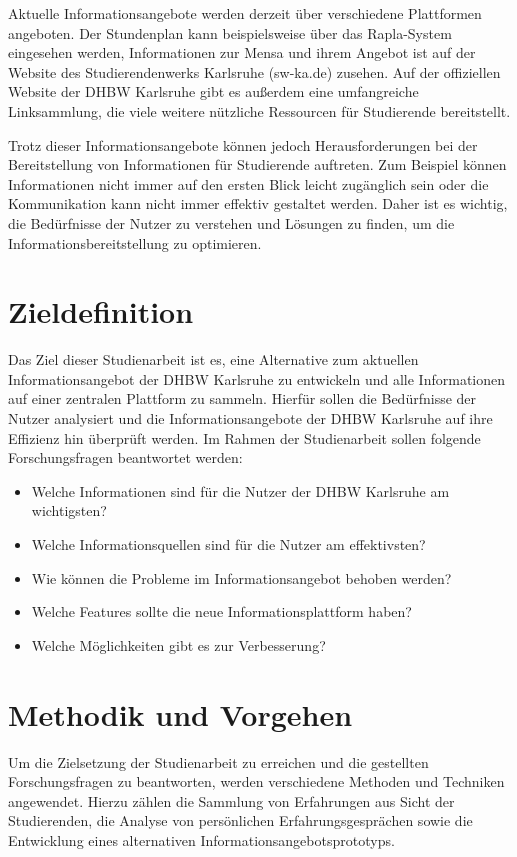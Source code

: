 Aktuelle Informationsangebote werden derzeit über verschiedene Plattformen angeboten. Der Stundenplan kann beispielsweise über das Rapla-System eingesehen werden, Informationen zur Mensa und ihrem Angebot ist auf der Website des Studierendenwerks Karlsruhe (sw-ka.de) zusehen. Auf der offiziellen Website der DHBW Karlsruhe gibt es außerdem eine umfangreiche Linksammlung, die viele weitere nützliche Ressourcen für Studierende bereitstellt.

Trotz dieser Informationsangebote können jedoch Herausforderungen bei der Bereitstellung von Informationen für Studierende auftreten. Zum Beispiel können Informationen nicht immer auf den ersten Blick leicht zugänglich sein oder die Kommunikation kann nicht immer effektiv gestaltet werden. Daher ist es wichtig, die Bedürfnisse der Nutzer zu verstehen und Lösungen zu finden, um die Informationsbereitstellung zu optimieren.


\section{Zieldefinition}
Das Ziel dieser Studienarbeit ist es, eine Alternative zum aktuellen Informationsangebot der DHBW Karlsruhe zu entwickeln und alle Informationen auf einer zentralen Plattform zu sammeln. Hierfür sollen die Bedürfnisse der Nutzer analysiert und die Informationsangebote der DHBW Karlsruhe auf ihre Effizienz hin überprüft werden.
Im Rahmen der Studienarbeit sollen folgende Forschungsfragen beantwortet werden:
\begin{itemize}
	\item Welche Informationen sind für die Nutzer der DHBW Karlsruhe am wichtigsten?
	\item Welche Informationsquellen sind für die Nutzer am effektivsten?
	\item Wie können die Probleme im Informationsangebot behoben werden?
	\item Welche Features sollte die neue Informationsplattform haben?
	\item Welche Möglichkeiten gibt es zur Verbesserung?
\end{itemize}
\newpage
\section{Methodik und Vorgehen}
Um die Zielsetzung der Studienarbeit zu erreichen und die gestellten Forschungsfragen zu beantworten, werden verschiedene Methoden und Techniken angewendet. Hierzu zählen die Sammlung von Erfahrungen aus Sicht der Studierenden, die Analyse von persönlichen Erfahrungsgesprächen sowie die Entwicklung eines alternativen Informationsangebotsprototyps.

